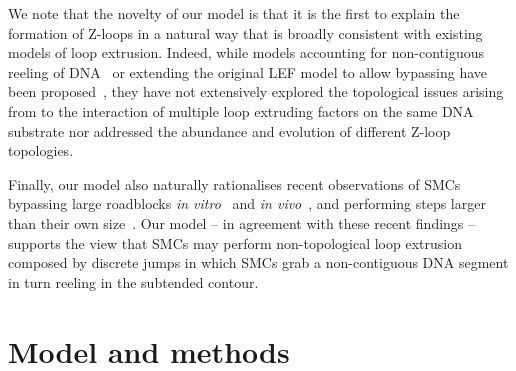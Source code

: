 \documentclass[aps,prl,twocolumn,a4paper,10pt,notitlepage,footinbib,nobalancelastpage,superscriptaddress,showpacs,floatfix]{revtex4-1}%
\begin{document}
We note that the novelty of our model is that it is the first to explain the formation of Z-loops in a natural way that is broadly consistent with existing models of loop extrusion. Indeed, while models accounting for non-contiguous reeling of DNA~\cite{Takaki2020,Higashi2021} or extending the original LEF model to allow bypassing have been proposed~\cite{Brandao2019a,Brandao2021}, they have not extensively explored the topological issues arising from to the interaction of multiple loop extruding factors on the same DNA substrate nor addressed the abundance and evolution of different Z-loop topologies.
 
Finally, our model also naturally rationalises recent observations of SMCs bypassing large roadblocks \emph{in vitro}~\cite{Pradhan2021} and  \emph{in vivo}~\cite{Brandao2021}, and performing steps larger than their own size~\cite{Ryu2021stepsize}. Our model -- in agreement with these recent findings -- supports the view that SMCs may perform non-topological loop extrusion composed by discrete jumps in which SMCs grab a non-contiguous DNA segment in turn reeling in the subtended contour. 

\section{Model and methods}
\end{document}
